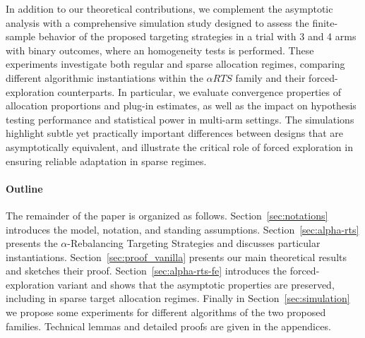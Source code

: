 In addition to our theoretical contributions, we complement the asymptotic analysis with a comprehensive simulation study designed to assess the finite-sample behavior of the proposed targeting strategies in a trial with 3 and 4 arms with binary outcomes, where an homogeneity tests is performed. These experiments investigate both regular and sparse allocation regimes, comparing different algorithmic instantiations within the \(\alpha RTS\) family and their forced-exploration counterparts. In particular, we evaluate convergence properties of allocation proportions and plug-in estimates, as well as the impact on hypothesis testing performance and statistical power in multi-arm settings. The simulations highlight subtle yet practically important differences between designs that are asymptotically equivalent, and illustrate the critical role of forced exploration in ensuring reliable adaptation in sparse regimes.


\paragraph*{Outline}
The remainder of the paper is organized as follows. Section~\ref{sec:notations} introduces the model, notation, and standing assumptions. Section~\ref{sec:alpha-rts} presents the $\alpha$-Rebalancing Targeting Strategies and discusses particular instantiations. Section~\ref{sec:proof_vanilla} presents our main theoretical results and sketches their proof. Section~\ref{sec:alpha-rts-fe} introduces the forced-exploration variant and shows that the asymptotic properties are preserved, including in sparse target allocation regimes. Finally in Section~\ref{sec:simulation} we propose some experiments for different algorithms of the two proposed families. Technical lemmas and detailed proofs are given in the appendices.


